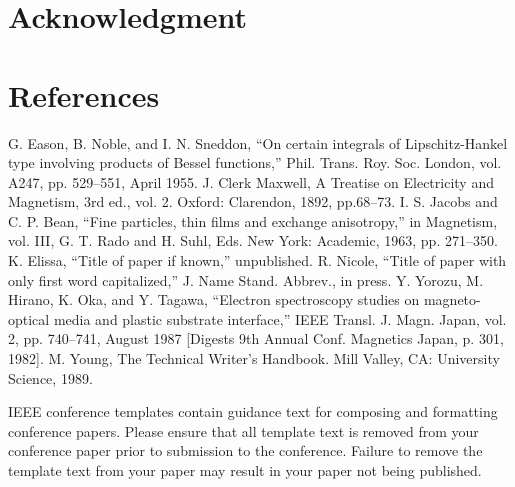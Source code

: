 \documentclass[conference]{IEEEtran}
\begin{document}
\section*{Acknowledgment}



\section*{References}


\begin{thebibliography}{00}
 G. Eason, B. Noble, and I. N. Sneddon, ``On certain integrals of Lipschitz-Hankel type involving products of Bessel functions,'' Phil. Trans. Roy. Soc. London, vol. A247, pp. 529--551, April 1955.
 J. Clerk Maxwell, A Treatise on Electricity and Magnetism, 3rd ed., vol. 2. Oxford: Clarendon, 1892, pp.68--73.
 I. S. Jacobs and C. P. Bean, ``Fine particles, thin films and exchange anisotropy,'' in Magnetism, vol. III, G. T. Rado and H. Suhl, Eds. New York: Academic, 1963, pp. 271--350.
 K. Elissa, ``Title of paper if known,'' unpublished.
 R. Nicole, ``Title of paper with only first word capitalized,'' J. Name Stand. Abbrev., in press.
 Y. Yorozu, M. Hirano, K. Oka, and Y. Tagawa, ``Electron spectroscopy studies on magneto-optical media and plastic substrate interface,'' IEEE Transl. J. Magn. Japan, vol. 2, pp. 740--741, August 1987 [Digests 9th Annual Conf. Magnetics Japan, p. 301, 1982].
 M. Young, The Technical Writer's Handbook. Mill Valley, CA: University Science, 1989.
\end{thebibliography}
\vspace{12pt}
\color{red}
IEEE conference templates contain guidance text for composing and formatting conference papers. Please ensure that all template text is removed from your conference paper prior to submission to the conference. Failure to remove the template text from your paper may result in your paper not being published.
\end{document}

